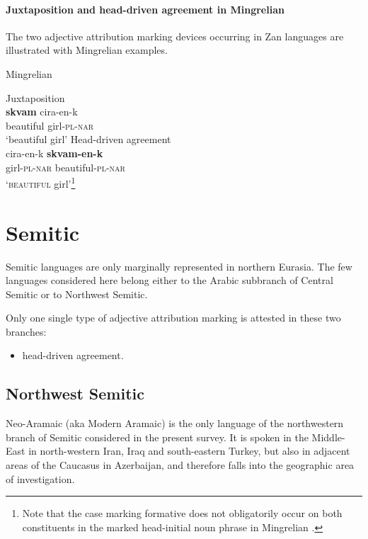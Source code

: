 \paragraph*{Juxtaposition and head\hyp{}driven agreement in Mingrelian}
The two adjective attribution marking devices occurring in Zan languages are illustrated with Mingrelian examples.
\begin{exe}
\ex \rm{Mingrelian \citep[361–364]{harris1991b}}
\begin{xlist}
\ex \rm{Juxtaposition}\\
\label{mingrelian juxt}
\gll	\textbf{skvam} cira-en-k\\
	beautiful girl-\textsc{pl}-\textsc{nar}\\
\glt	‘beautiful girl’%
\ex \rm{Head\hyp{}driven agreement}\\
\label{mingrelian agr}
\gll	cira-en-k \textbf{skvam-en-k}\\
	girl-\textsc{pl}-\textsc{nar} beautiful-\textsc{pl}-\textsc{nar}\\
\glt	‘\textsc{beautiful} girl’\footnote{Note that the case marking formative does not obligatorily occur on both constituents in the marked head-initial noun phrase in Mingrelian \citep[363–364]{harris1991b}.}%
\end{xlist}
\end{exe}

\section{Semitic}
Semitic languages are only marginally represented in northern Eurasia. The few languages considered here belong either to the Arabic subbranch of Central Semitic or to Northwest Semitic.

Only one single type of adjective attribution marking is attested in these two branches:
\begin{itemize}
\item head\hyp{}driven agreement.
\end{itemize}

\subsection{Northwest Semitic}
Neo-Aramaic (aka Modern Aramaic) is the only language of the northwestern branch of Semitic considered in the present survey. It is spoken in the Middle-East in north-western Iran, Iraq and south-eastern Turkey, but also in adjacent areas of the Caucasus in Azerbaijan, and therefore falls into the geographic area of investigation.


